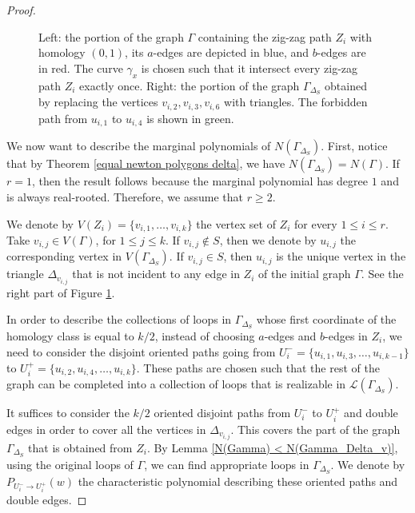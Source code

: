 \documentclass[10pt,a4paper]{amsart}
\begin{document}
\begin{proof}
\begin{figure}[h!]
    \caption{\label{fig:Zi_in_Gamma_Gamma_DeltaS} Left: the portion of the graph $\Gamma$ containing the zig-zag path $Z_i$ with homology $(0,1)$, its $a$-edges are depicted in blue, and $b$-edges are in red. The curve $\gamma_x$ is chosen such that it intersect every zig-zag path $Z_i$ exactly once. Right: the portion of the graph $\Gamma_{\Delta_S}$ obtained by replacing the vertices $v_{i,2}, v_{i,3}, v_{i,6}$ with triangles. The forbidden path from $u_{i,1}$ to $u_{i,4}$ is shown in green.}
    \end{figure}

    We now want to describe the marginal polynomials of $N(\Gamma_{\Delta_S})$. First, notice that by Theorem \ref{equal newton polygons delta}, we have $N(\Gamma_{\Delta_S}) = N(\Gamma)$. If $r = 1$, then the result follows because the marginal polynomial has degree $1$ and is always real-rooted. Therefore, we assume that $r \geq 2$.

    We denote by $V(Z_i) = \{v_{i,1}, \dots, v_{i,k}\}$ the vertex set of $Z_i$ for every $1 \leq i \leq r$. Take $v_{i,j} \in V(\Gamma)$, for $1 \leq j \leq k$. 
    If $v_{i,j} \notin S$, then we denote by $u_{i,j}$ the corresponding vertex in $V(\Gamma_{\Delta_S})$. If $v_{i,j} \in S$, then $u_{i,j}$ is the unique vertex in the triangle $\Delta_{v_{i,j}}$ that is not incident to any edge in $Z_i$ of the initial graph $\Gamma$. See the right part of Figure \ref{fig:Zi_in_Gamma_Gamma_DeltaS}.

    In order to describe the collections of loops in $\Gamma_{\Delta_S}$ whose first coordinate of the homology class is equal to $k/2$, instead of choosing $a$-edges and $b$-edges in $Z_i$, we need to consider the disjoint oriented paths going from $U^-_{i} = \{u_{i,1}, u_{i, 3}, \dots, u_{i, k-1}\}$ to $U^+_{i} = \{u_{i,2}, u_{i, 4}, \dots, u_{i, k}\}$. These paths are chosen such that the rest of the graph can be completed into a collection of loops that is realizable in $\mathcal{L}(\Gamma_{\Delta_S})$.

    It suffices to consider the $k/2$ oriented disjoint paths from $U^-_{i}$ to $U^+_{i}$ and double edges in order to cover all the vertices in $\Delta_{v_{i,j}}$. This covers the part of the graph $\Gamma_{\Delta_S}$ that is obtained from $Z_i$. By Lemma \ref{N(Gamma) < N(Gamma_Delta_v)}, using the original loops of $\Gamma$, we can find appropriate loops in $\Gamma_{\Delta_S}$. We denote by $P_{U^-_{i} \to U^+_{i}}(w)$ the characteristic polynomial describing these oriented paths and double edges.
    

\end{proof}
\end{document}
